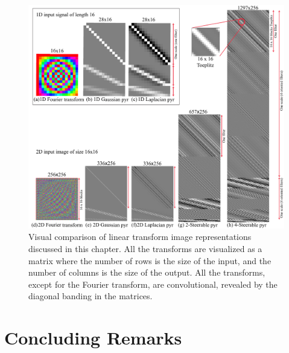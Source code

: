 

%
%
%


\begin{figure}[t]
\includegraphics[width=1\linewidth]{figures/pyramids/visualizations_pyr2.pdf}
\caption{Visual comparison of linear transform image representations discussed in this chapter. All the transforms are visualized as a matrix where the number of rows is the size of the input, and the number of columns is the size of the output. All the transforms, except for the Fourier transform, are convolutional, revealed by the diagonal banding in the matrices. 
}
\label{fig:pictorialsummary_pyr}
\end{figure}


\section{Concluding Remarks}


